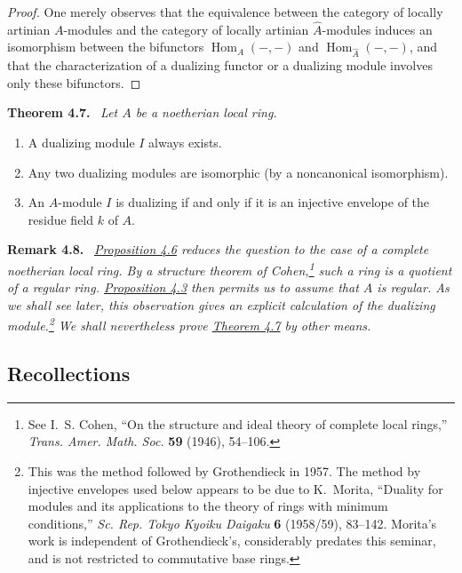 \documentclass[11pt,a4paper,oneside]{book}
\providecommand{\Homop}{\operatorname{Hom}}
\newenvironment{sgastatement}[1]
  {\par\addvspace{0.8\baselineskip}\noindent\textbf{#1.}\ \itshape}
  {\par\addvspace{0.35\baselineskip}}
\theoremstyle{plain}
\theoremstyle{definition}
\theoremstyle{remark}
\begin{document}
\begin{proof}
One merely observes that the equivalence between the category of locally
artinian $A$-modules and the category of locally artinian
$\widehat A$-modules induces an isomorphism between the bifunctors
$\Homop_A(-,-)$ and $\Homop_{\widehat A}(-,-)$, and that the
characterization of a dualizing functor or a dualizing module involves only
these bifunctors.
\end{proof}

\begin{sgastatement}{Theorem 4.7}
Let $A$ be a noetherian local ring.
\begin{enumerate}[label=\textup{\alph*)},leftmargin=2.5em]
\item A dualizing module $I$ always exists.
\item Any two dualizing modules are isomorphic (by a noncanonical
isomorphism).
\item An $A$-module $I$ is dualizing if and only if it is an injective
envelope of the residue field $k$ of $A$.
\end{enumerate}
\end{sgastatement}

\begin{sgastatement}{Remark 4.8}
\hyperref[IV.4.6]{Proposition 4.6} reduces the question to the case of a complete noetherian
local ring. By a structure theorem of Cohen,\footnote{See I.~S. Cohen,
``On the structure and ideal theory of complete local rings,''
\emph{Trans. Amer. Math. Soc.} \textbf{59} (1946), 54--106.}
such a ring is a quotient of a regular ring. \hyperref[IV.4.3]{Proposition 4.3} then permits us
to assume that $A$ is regular. As we shall see later, this observation gives
an explicit calculation of the dualizing module.\footnote{This was the
method followed by Grothendieck in 1957. The method by injective envelopes
used below appears to be due to K.~Morita, ``Duality for modules and its
applications to the theory of rings with minimum conditions,''
  \emph{Sc. Rep. Tokyo Kyoiku Daigaku} \textbf{6} (1958/59), 83--142.
Morita's work is independent of Grothendieck's, considerably predates this
seminar, and is not restricted to commutative base rings.}
We shall nevertheless prove \hyperref[IV.4.7]{Theorem 4.7} by other means.
\end{sgastatement}

\subsection*{Recollections}
\end{document}
